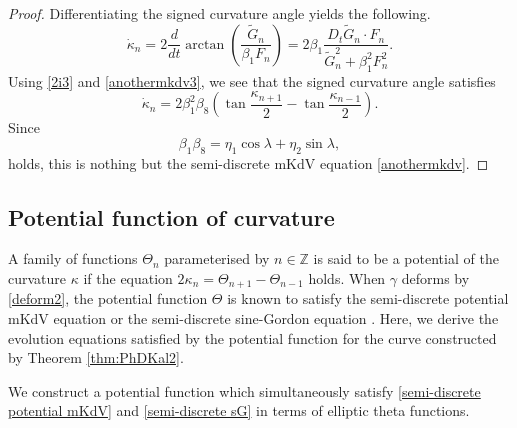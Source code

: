 \documentclass[10pt,leqno]{amsart}
\numberwithin{equation}{section}
\begin{document}
\begin{proof}
Differentiating the signed curvature angle yields the following.
\begin{equation}
    \dot{\kappa}_{n}=2\frac{d}{dt}\arctan\left(\frac{\widetilde{G}_{n}}{\beta_{1} F_{n}}\right)=2\beta_{1}\frac{D_{t}\widetilde{G}_{n}\cdot F_{n}}{\widetilde{G}_{n}^{2}+\beta_{1}^2 F_{n}^{2}}.
\end{equation}
    Using \eqref{2i3} and \eqref{anothermkdv3}, we see that the signed curvature angle satisfies
\begin{equation}
\dot\kappa_{n}=2\beta_{1}^2\beta_{8}\left(\tan\frac{\kappa_{n+1}}{2}-\tan\frac{\kappa_{n-1}}{2}\right).
\end{equation}
Since
\begin{equation}
\beta_{1}\beta_{8}=\eta_{1}\cos\lambda+\eta_{2}\sin\lambda,
\end{equation}
holds, this is nothing but the semi-discrete mKdV equation \eqref{anothermkdv}.
\end{proof}


\subsection{Potential function of curvature}\label{subsection:Potential function for curvature}
A family of functions $\Theta_n$ parameterised by $n\in \mathbb{Z}$ is said to be a potential of the curvature $\kappa$ if the equation
$2\kappa_{n}=\Theta_{n+1}-\Theta_{n-1}$ holds.
When $\gamma$ deforms by \eqref{deform2}, the potential function $\Theta$ is known to satisfy the semi-discrete potential mKdV equation or the semi-discrete sine-Gordon equation \cite{KKP:linkage}. 
Here, we derive the evolution equations satisfied by the potential function for the curve constructed by Theorem \ref{thm:PhDKal2}. 

We construct a potential function
which simultaneously satisfy
\eqref{semi-discrete potential mKdV}
and \eqref{semi-discrete sG}
in terms of elliptic theta functions.
\end{document}
